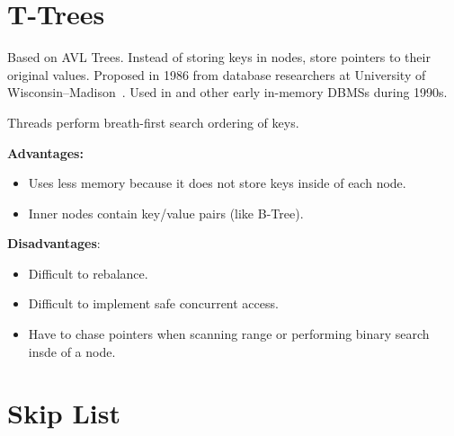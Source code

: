 \documentclass[11pt]{article}
\begin{document}
\maketitle
\thispagestyle{plain}

\section{T-Trees}
Based on AVL Trees. Instead of storing keys in nodes, store pointers to their original 
values. Proposed in 1986 from database researchers at University of Wisconsin--Madison~\cite{P294}.
Used in  and other early in-memory DBMSs during 1990s.

Threads perform breath-first search ordering of keys.

\textbf{Advantages:}
\begin{itemize}
    \item
    Uses less memory because it does not store keys inside of each node.
    
    \item
    Inner nodes contain key/value pairs (like B-Tree).
\end{itemize}

\textbf{Disadvantages}:
\begin{itemize}
    \item
    Difficult to rebalance.
    
    \item
    Difficult to implement safe concurrent access.
    
    \item
    Have to chase pointers when scanning range or performing binary search insde of a node.
\end{itemize}

\section{Skip List}
\end{document}
